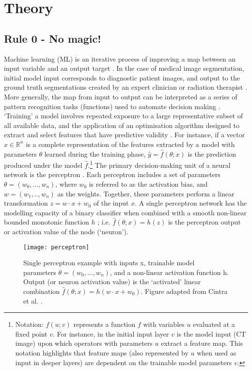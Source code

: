 \chapter{Theory}
\label{ch:theory}

\section{Rule 0 - No magic!}
\label{NoMagic}
Machine learning (ML) is an iterative process of improving a map between an input variable and an output target \cite{Maier2019}. In the case of medical image segmentation, initial model input corresponds to diagnostic patient images, and output to the ground truth segmentations created by an expert clinician or radiation therapist \cite{Kazemifar_2018}. More generally, the map from input to output can be interpreted as a series of pattern recognition tasks (functions) used to automate decision making \cite{Maier2019}. `Training' a model involves repeated exposure to a large representative subset of all available data, and the application of an optimisation algorithm designed to extract and select features that have predictive validity \cite{Maier2019}. For instance, if a vector $x\in\mathbb{R}^{n}$ is a complete representation of the features extracted by a model with parameters $\theta$ learned during the training phase, $\hat{y} = \hat{f}(\theta; x)$ is the prediction produced under the model $\hat{f}$.\footnote{Notation: $f(u; v)$ represents a function $f$ with variables $u$ evaluated at a fixed point $v$. For instance, in the initial input layer $v$ is the model input (CT image) upon which operators with parameters $u$ extract a feature map. This notation highlights that feature maps (also represented by $u$ when used as input in deeper layers) are dependent on the trainable model parameters $v$.} The primary decision-making unit of a neural network is the perceptron \cite{Maier2019}. Each perceptron includes a set of parameters $\theta = (w_{0}, ...,w_{n} )$, where $w_{0}$ is referred to as the activation bias, and $w = (w_{1},..,w_{n})$ as the weights. Together, these parameters perform a linear transformation $z = w \cdot x + w_{0}$ of the input $x$. A single perceptron network has the modelling capacity of a binary classifier when combined with a smooth non-linear bounded monotonic function $h$ \cite{Maier2019}; i.e. $\hat{f}(\theta; x) = h(z)$ is the perceptron output or activation value of the node (`neuron'). 


\begin{figure}[H]
	\begin{center}
		\texttt{[image: perceptron]}
		\caption{Single perceptron example with inputs x, trainable model parameters $\theta = (w_{0}, ...,w_{n} )$, and a non-linear activation function h. Output (or neuron activation value) is the `activated' linear combination $\hat{f}(\theta; x) = h(w \cdot x + w_{0})$. Figure adapted from Cintra et al. \cite{cintra2018}.}
		\label{fig:percept}
	\end{center}
\end{figure}
 


